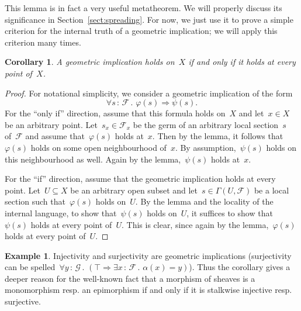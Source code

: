 \documentclass[10pt]{amsart}
\makeatletter
\theoremstyle{definition}
\newtheorem{ex}[defn]{Example}
\theoremstyle{plain}
\newtheorem{cor}[defn]{Corollary}
\theoremstyle{remark}
\newcommand{\F}{\mathcal{F}}
\renewcommand{\G}{\mathcal{G}}
\newcommand{\?}{\,{:}\,}
\renewcommand{\_}{\mathpunct{.}\,}
\newcommand{\resp}{resp.\@\xspace}
\makeatother
\begin{document}
This lemma is in fact a very useful metatheorem. We will properly discuss its
significance in Section~\ref{sect:spreading}. For now, we just use it to prove a
simple criterion for the internal truth of a geometric implication; we will
apply this criterion many times.

\begin{cor}\label{cor:geometric-implication}
A geometric implication holds on~$X$ if and only if it holds at
every point of~$X$.\end{cor}
\begin{proof}For notational simplicity, we consider a geometric implication of
the form
\[ \forall s\?\F\_ \varphi(s) \Rightarrow \psi(s). \]
For the ``only if'' direction, assume that this formula holds on~$X$ and let~$x
\in X$ be an arbitrary point. Let~$s_x \in \F_x$ be the germ of an arbitrary
local section~$s$ of~$\F$ and assume that~$\varphi(s)$ holds at~$x$. Then by
the lemma, it follows that~$\varphi(s)$ holds on some open neighbourhood of~$x$. By
assumption,~$\psi(s)$ holds on this neighbourhood as well. Again by the
lemma,~$\psi(s)$ holds at~$x$.

For the ``if'' direction, assume that the geometric implication holds at every
point. Let~$U \subseteq X$ be an arbitrary open subset and let~$s \in
\Gamma(U,\F)$ be a local section such that~$\varphi(s)$ holds on~$U$. By the
lemma and the locality of the internal language, to show that~$\psi(s)$ holds
on~$U$, it suffices to show that~$\psi(s)$
holds at every point of~$U$. This is clear, since again by the
lemma,~$\varphi(s)$ holds at every point of~$U$.
\end{proof}

\begin{ex}Injectivity and surjectivity are geometric implications (surjectivity
can be spelled~$\forall y\?\G\_ (\top \Rightarrow \exists x\?\F\_ \alpha(x) =
y)$). Thus the corollary gives a deeper reason for the well-known fact that a
morphism of sheaves is a monomorphism \resp an epimorphism if and only if it is
stalkwise injective \resp surjective.\end{ex}
\end{document}

